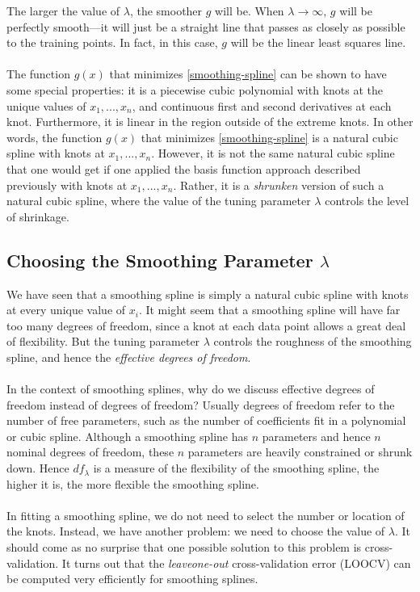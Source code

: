 The larger the value of $\lambda$, the smoother $g$ will be. When $\lambda \rightarrow \infty$, $g$ will be perfectly smooth—it will just be a straight line that passes as closely as possible to the training points. In fact, in this case, $g$ will be the linear least squares line.\\\\
The function $g(x)$ that minimizes \ref{smoothing-spline}  can be shown to have some special properties: it is a piecewise cubic polynomial with knots at the unique
values of $x_1,...,x_n$, and continuous first and second derivatives at each knot. Furthermore, it is linear in the region outside of the extreme knots. In other words, the function $g(x)$ that minimizes \ref{smoothing-spline} is a natural cubic
spline with knots at $x_1,...,x_n$. However, it is not the same natural cubic
spline that one would get if one applied the basis function approach described previously with knots at $x_1,...,x_n$. Rather, it is a \textit{shrunken} version of such a natural cubic spline, where the value of the tuning parameter $\lambda$ controls the level of shrinkage.

\subsection{Choosing the Smoothing Parameter $\lambda$}
We have seen that a smoothing spline is simply a natural cubic spline with knots at every unique value of $x_i$. It might seem that a smoothing spline will have far too many degrees of freedom, since a knot at each data point allows a great deal of flexibility. But the tuning parameter $\lambda$ controls the roughness of the smoothing spline, and hence the \textit{effective degrees of freedom}.\\\\
In the context of smoothing splines, why do we discuss effective degrees of freedom instead of degrees of freedom? Usually degrees of freedom refer to the number of free parameters, such as the number of coefficients fit in a polynomial or cubic spline. Although a smoothing spline has $n$ parameters and hence $n$ nominal degrees of freedom, these $n$ parameters are heavily constrained or shrunk down. Hence $df_\lambda$ is a measure of the flexibility of the smoothing spline, the higher it is, the more flexible the smoothing spline.\\\\
In fitting a smoothing spline, we do not need to select the number or location of the knots. Instead, we have another problem: we need to choose the value of $\lambda$. It should come as no surprise that one possible solution to this problem
is cross-validation. It turns out that the \textit{leaveone-out} cross-validation error (LOOCV) can be computed very efficiently for smoothing splines.

